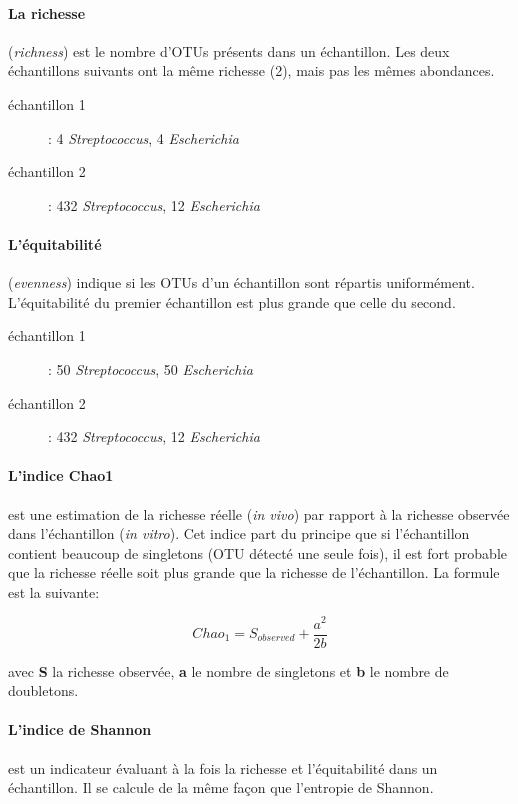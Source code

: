 \documentclass[12pt,a4paper]{article}
\begin{document}
\paragraph{La richesse}(\textit{richness}) est le nombre d'OTUs présents dans un échantillon. Les deux échantillons suivants ont la même richesse (2), mais pas les mêmes abondances.

\begin{description}
\item[échantillon 1] : 4 \textit{Streptococcus}, 4 \textit{Escherichia}
\item[échantillon 2] : 432 \textit{Streptococcus}, 12 \textit{Escherichia}
\end{description}

\paragraph{L'équitabilité}(\textit{evenness}) indique si les OTUs d’un échantillon sont répartis uniformément.
L'équitabilité du premier échantillon est plus grande que celle du second.

\begin{description}
\item[échantillon 1] : 50 \textit{Streptococcus}, 50 \textit{Escherichia}
\item[échantillon 2] : 432 \textit{Streptococcus}, 12 \textit{Escherichia}
\end{description}


\paragraph{L'indice Chao1}est une estimation de la richesse réelle (\textit{in vivo}) par rapport à la richesse observée dans l'échantillon (\textit{in vitro}). Cet indice part du principe que si l’échantillon contient beaucoup de singletons (OTU détecté une seule fois), il est fort probable que la richesse réelle soit plus grande que la richesse de l’échantillon. La formule est la suivante:

\begin{mycapequ}[!h]
   \begin{equation}
     Chao_{1} = S_{observed} + \frac{a^2}{2b}
   \end{equation}
      \caption{avec \textbf{S} la richesse observée, \textbf{a} le nombre de singletons et \textbf{b} le nombre de doubletons.}
\end{mycapequ}

\paragraph{L'indice de Shannon} est un indicateur évaluant à la fois la richesse et l'équitabilité dans un échantillon. Il se calcule de la même façon que l’entropie de Shannon.
\end{document}
